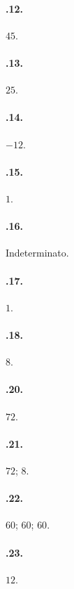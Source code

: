\begin{multicols}{2}
\paragraph{\thechapter.12.}
$45$.

\paragraph{\thechapter.13.}
$25$.

\paragraph{\thechapter.14.}
$-12$.

\paragraph{\thechapter.15.}
$1$.

\paragraph{\thechapter.16.}
Indeterminato.

\paragraph{\thechapter.17.}
$1$.

\paragraph{\thechapter.18.}
$8$.

\paragraph{\thechapter.20.}
$72$.

\paragraph{\thechapter.21.}
$72$; $8$.

\paragraph{\thechapter.22.}
$60$; $60$; $60$.

\paragraph{\thechapter.23.}
$12$.


\end{multicols}
